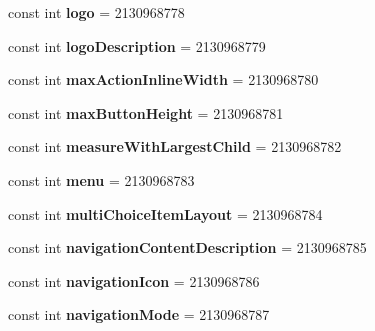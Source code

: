 \begin{DoxyCompactItemize}
const int {\bfseries logo} = 2130968778
\item 
\mbox{\label{classst_delivery_1_1_resource_1_1_attribute_a5cd3d579809b9fd5aa6d4a4a142bec51}} 
const int {\bfseries logo\+Description} = 2130968779
\item 
\mbox{\label{classst_delivery_1_1_resource_1_1_attribute_ad5c60088b9a96b1db878f555f0727d81}} 
const int {\bfseries max\+Action\+Inline\+Width} = 2130968780
\item 
\mbox{\label{classst_delivery_1_1_resource_1_1_attribute_a7d337128ad2df97861e399ef2c4adff4}} 
const int {\bfseries max\+Button\+Height} = 2130968781
\item 
\mbox{\label{classst_delivery_1_1_resource_1_1_attribute_a24d0264f8e92fc245fadc8da94cb0232}} 
const int {\bfseries measure\+With\+Largest\+Child} = 2130968782
\item 
\mbox{\label{classst_delivery_1_1_resource_1_1_attribute_a46b1dcff5adfe2df953977d91957a144}} 
const int {\bfseries menu} = 2130968783
\item 
\mbox{\label{classst_delivery_1_1_resource_1_1_attribute_aa68b06a9e896797faa67588b2301309a}} 
const int {\bfseries multi\+Choice\+Item\+Layout} = 2130968784
\item 
\mbox{\label{classst_delivery_1_1_resource_1_1_attribute_adb95c5e452469b2d0fc5a1d0e7ec9d0f}} 
const int {\bfseries navigation\+Content\+Description} = 2130968785
\item 
\mbox{\label{classst_delivery_1_1_resource_1_1_attribute_af5e63dc09839350ecc836059569bc3f0}} 
const int {\bfseries navigation\+Icon} = 2130968786
\item 
\mbox{\label{classst_delivery_1_1_resource_1_1_attribute_abc4ad7441e034281d891461a9bcc1599}} 
const int {\bfseries navigation\+Mode} = 2130968787

\end{DoxyCompactItemize}
